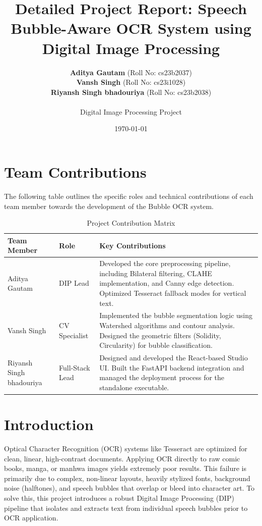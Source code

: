 \documentclass{article}
\title{\textbf{Detailed Project Report: Speech Bubble-Aware OCR System using Digital Image Processing}}
\author{
    \textbf{Aditya Gautam} (Roll No: cs23b2037) \\
    \textbf{Vansh Singh} (Roll No: cs23i1028) \\
    \textbf{Riyansh Singh bhadouriya} (Roll No: cs23b2038) \\
    \vspace{0.5cm} \\
    Digital Image Processing Project
}
\date{\today}
\begin{document}
\maketitle

\section{Team Contributions}
The following table outlines the specific roles and technical contributions of each team member towards the development of the Bubble OCR system.

\begin{table}[H]
    \centering
    \begin{tabular}{@{}llp{8cm}@{}}
    \toprule
    \textbf{Team Member} & \textbf{Role} & \textbf{Key Contributions} \\ \midrule
    Aditya Gautam & DIP Lead & Developed the core preprocessing pipeline, including Bilateral filtering, CLAHE implementation, and Canny edge detection. Optimized Tesseract fallback modes for vertical text. \\
    Vansh Singh & CV Specialist & Implemented the bubble segmentation logic using Watershed algorithms and contour analysis. Designed the geometric filters (Solidity, Circularity) for bubble classification. \\
    Riyansh Singh bhadouriya & Full-Stack Lead & Designed and developed the React-based Studio UI. Built the FastAPI backend integration and managed the deployment process for the standalone executable. \\ \bottomrule
    \end{tabular}
    \caption{Project Contribution Matrix}
\end{table}

\section{Introduction}
Optical Character Recognition (OCR) systems like Tesseract are optimized for clean, linear, high-contrast documents. Applying OCR directly to raw comic books, manga, or manhwa images yields extremely poor results. This failure is primarily due to complex, non-linear layouts, heavily stylized fonts, background noise (halftones), and speech bubbles that overlap or bleed into character art. To solve this, this project introduces a robust Digital Image Processing (DIP) pipeline that isolates and extracts text from individual speech bubbles prior to OCR application.
\end{document}
